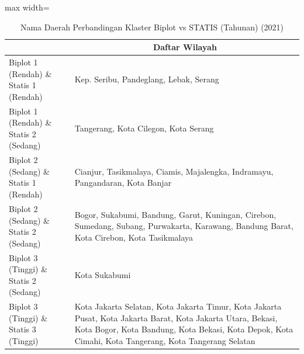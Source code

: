 \begin{table}[H]
\centering
\caption{Nama Daerah Perbandingan Klaster Biplot vs STATIS (Tahunan) (2021)} \label{tab:app1biplot_statis_comp_name_2021}
\begin{adjustbox}{max width=\textwidth}
\begin{tabular}{|>{\centering\arraybackslash}p{4cm}|p{10cm}|}
\hline
\multicolumn{1}{|c|}{\textbf{Kategori}} & \multicolumn{1}{c|}{\textbf{Daftar Wilayah}} \\
\hline
Biplot 1 (Rendah) \& Statis 1 (Rendah) & Kep. Seribu, Pandeglang, Lebak, Serang \\
\hline
Biplot 1 (Rendah) \& Statis 2 (Sedang) & Tangerang, Kota Cilegon, Kota Serang \\
\hline
Biplot 2 (Sedang) \& Statis 1 (Rendah) & Cianjur, Tasikmalaya, Ciamis, Majalengka, Indramayu, Pangandaran, Kota Banjar \\
\hline
Biplot 2 (Sedang) \& Statis 2 (Sedang) & Bogor, Sukabumi, Bandung, Garut, Kuningan, Cirebon, Sumedang, Subang, Purwakarta, Karawang, Bandung Barat, Kota Cirebon, Kota Tasikmalaya \\
\hline
Biplot 3 (Tinggi) \& Statis 2 (Sedang) & Kota Sukabumi \\
\hline
Biplot 3 (Tinggi) \& Statis 3 (Tinggi) & Kota Jakarta Selatan, Kota Jakarta Timur, Kota Jakarta Pusat, Kota Jakarta Barat, Kota Jakarta Utara, Bekasi, Kota Bogor, Kota Bandung, Kota Bekasi, Kota Depok, Kota Cimahi, Kota Tangerang, Kota Tangerang Selatan \\
\hline
\end{tabular}
\end{adjustbox}
\end{table}